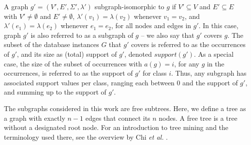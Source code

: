 \documentclass{sig-alternate}
\begin{document}
A graph $g'=(V',E',\Sigma',\lambda')$ subgraph-isomorphic to $g$ if $V'
\subseteq V$ and $E' \subseteq E$ with $V' \ne \emptyset$ and $E' \ne
\emptyset$, $\lambda'(v_1)=\lambda(v_2)$ whenever $v_1=v_2$, and
$\lambda'(e_1)=\lambda(e_2)$ whenever $e_1=e_2$, for all nodes and edges in
$g'$. In this case, graph $g'$ is also referred to as a subgraph of $g$ -- we also say
that $g'$ covers $g$. The subset of the database instances $G$ that $g'$
covers is referred to as the occurrences of $g'$, and its size as (total) support of
$g'$, denoted $support(g')$. As a special case, the size of the subset of occurrences with $a(g)=i$,
for any $g$ in the occurrences, is referred to as the support of $g'$ for class
$i$. Thus, any subgraph has associated support values per class, ranging each
between 0 and the support of $g'$, and summing up to the support of $g'$.

The subgraphs considered in this work are free subtrees. Here, we define a tree
as a graph with exactly $n-1$ edges that connect its $n$ nodes. A free tree is
a tree without a designated root node. For an introduction to tree mining and
the terminology used there, see the overview by Chi \emph{et al.}
\cite{CMNK01Frequent}.
\end{document}
